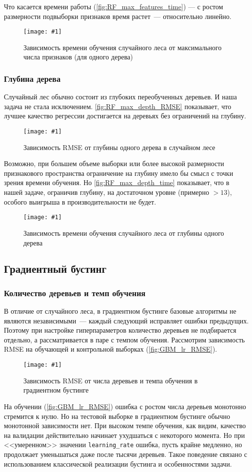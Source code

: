 \documentclass[12pt]{article}
\newcommand{\mpl}[2]{
    \begin{figure}[!h]
        \texttt{[image: \#1]}
        \centering
        \caption{#2}
        \label{fig:#1}
     \end{figure}
}
\begin{document}
Что касается времени работы (\autoref{fig:RF_max_features_time}) — с ростом размерности подвыборки признаков время растет~--- относительно линейно.
\mpl{RF_max_features_time}{Зависимость времени обучения случайного леса от максимального числа признаков (для одного дерева)}

\subsubsection{Глубина дерева}
Случайный лес обычно состоит из глубоких переобученных деревьев. И наша задача не стала исключением. \autoref{fig:RF_max_depth_RMSE} показывает, что лучшее качество регрессии достигается на деревьях без ограничений на глубину.  
\mpl{RF_max_depth_RMSE}{Зависимость RMSE от глубины одного дерева в случайном лесе}

Возможно, при большем объеме выборки или более высокой размерности признакового пространства ограничение на глубину имело бы смысл с точки зрения времени обучения. Но \autoref{fig:RF_max_depth_time} показывает, что в нашей задаче, ограничив глубину, на достаточном уровне (примерно $>13$), особого выигрыша в производительности не будет.
\mpl{RF_max_depth_time}{Зависимость времени обучения случайного леса от глубины одного дерева}

\subsection{Градиентный бустинг}
\subsubsection{Количество деревьев и темп обучения}
В отличие от случайного леса, в градиентном бустинге базовые алгоритмы не являются независимыми~--- каждый следующий исправляет ошибки предыдущих. Поэтому при настройке гиперпараметров количество деревьев не подбирается отдельно, а рассматривается в паре с темпом обучения. Рассмотрим зависимость RMSE на обучающей и контрольной выборках (\autoref{fig:GBM_lr_RMSE}).

\mpl{GBM_lr_RMSE}{Зависимость RMSE от числа деревьев и темпа обучения в градиентном бустинге}

На обучении (\autoref{fig:GBM_lr_RMSE}) ошибка с ростом числа деревьев монотонно стремится к нулю. Но на тестовой выборке в градиентном бустинге обычно монотонной зависимости нет. При высоком темпе обучения, как видим, качество на валидации действительно начинает ухудшаться с некоторого момента. Но при <<умеренном>> значении \verb|learning_rate| ошибка, пусть крайне медленно, но продолжает уменьшаться даже после тысячи деревьев. Такое поведение связано с использованием классической реализации бустинга и особенностями задачи. 
\end{document}
